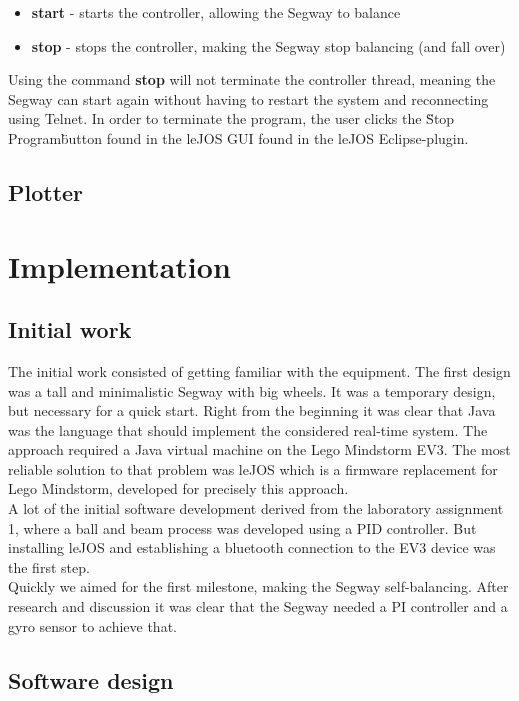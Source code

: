 \begin{itemize}
\item \textbf{start} - starts the controller, allowing the Segway to balance
\item \textbf{stop} - stops the controller, making the Segway stop balancing (and fall over)
\end{itemize}

\noindent Using the command \textbf{stop} will not terminate the controller thread, meaning the Segway can start again without having to restart the system and reconnecting using Telnet. In order to terminate the program, the user clicks the \"Stop Program\" button found in the leJOS GUI found in the leJOS Eclipse-plugin.

\subsection{Plotter}
  
\section{Implementation}
\subsection{Initial work}
The initial work consisted of getting familiar with the equipment. The first design was a tall and minimalistic Segway with big wheels. It was a temporary design, but necessary for a quick start. Right from the beginning it was clear that Java was the language that should implement the considered real-time system. The approach required a Java virtual machine on the Lego Mindstorm EV3. The most reliable solution to that problem was leJOS which is a firmware replacement for Lego Mindstorm, developed for precisely this approach. 
\\[3ex]
A lot of the initial software development derived from the laboratory assignment 1, where a ball and beam process\cite{laboratory1} was developed using a PID controller. But installing leJOS and establishing a bluetooth connection to the EV3 device was the first step. 
\\[3ex]
Quickly we aimed for the first milestone, making the Segway self-balancing. After research and discussion it was clear that the Segway needed a PI controller and a gyro sensor to achieve that. 

\subsection{Software design}


